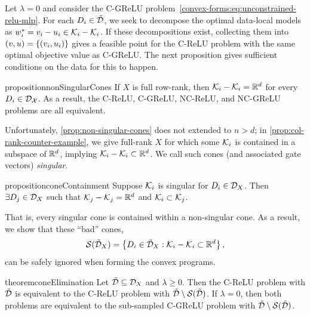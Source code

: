 Let \( \lambda = 0 \) and consider the C-GReLU problem~\eqref{convex-forms:eq:unconstrained-relu-mlp}.
For each \( D_i \in \tilde {\mathcal{D}} \), we seek to decompose the optimal data-local models as \( w^*_i = v_i - u_i \in \mathcal{K}_i - \mathcal{K}_i \).
If these decompositions exist, collecting them into \( (v, u) = \left\{(v_i, u_i)\right\} \) gives a feasible point for the C-ReLU problem with the same optimal objective value as C-GReLU.
The next proposition gives sufficient conditions on the data for this to happen.
\begin{restatable}{proposition}{nonSingularCones}\label{prop:non-singular-cones}
    If \( X \) is full row-rank, then \( \mathcal{K}_i - \mathcal{K}_i = \mathbb{R}^d  \) for every \( D_i \in \mathcal{D}_{\mathcal{X}} \).
    As a result, the C-ReLU, C-GReLU, NC-ReLU, and NC-GReLU problems are all equivalent.
\end{restatable}
Unfortunately, \cref{prop:non-singular-cones} does not extended to \( n > d \);
in \cref{prop:col-rank-counter-example}, we give full-rank \( X \) for which some \( \mathcal{K}_i \) is contained in a subspace of \( \mathbb{R}^d \), implying \( \mathcal{K}_i - \mathcal{K}_i \subset \mathbb{R}^d \).
We call such cones (and associated gate vectors) \emph{singular}.
\begin{restatable}{proposition}{coneContainment}\label{prop:cone-containment}
    Suppose \( \mathcal{K}_i \) is singular for \( D_i \in \mathcal{D}_{X} \).
    Then \( \exists D_j \in \mathcal{D}_{X} \) such that \( \mathcal{K}_j - \mathcal{K}_j = \mathbb{R}^d \) and \( \mathcal{K}_i \subset \mathcal{K}_j \).
\end{restatable}
That is, every singular cone is contained within a non-singular cone.
As a result, we show that these ``bad'' cones,
\begin{equation}\label{eq:singular-cones}
    \mathcal{S}(\tilde {\mathcal{D}}_X) = \left\{ D_i \in \tilde {\mathcal{D}}_X : \mathcal{K}_i - \mathcal{K}_i \subset \mathbb{R}^d \right\},
\end{equation}
can be safely ignored when forming the convex programs.
\begin{restatable}{theorem}{coneElimination}\label{thm:cone-elimination}
    Let \( \tilde {\mathcal{D}} \subseteq \mathcal{D}_X \) and \( \lambda \geq 0 \).
    Then the C-ReLU problem with \( \tilde {\mathcal{D}} \) is equivalent
    to the C-ReLU problem with \( \tilde {\mathcal{D}} \setminus \mathcal{S}(\tilde {\mathcal{D}}) \).
    If \( \lambda = 0 \), then both problems are equivalent to the sub-sampled
    C-GReLU problem with \( \tilde {\mathcal{D}} \setminus \mathcal{S}(\tilde {\mathcal{D}}) \).
\end{restatable}
